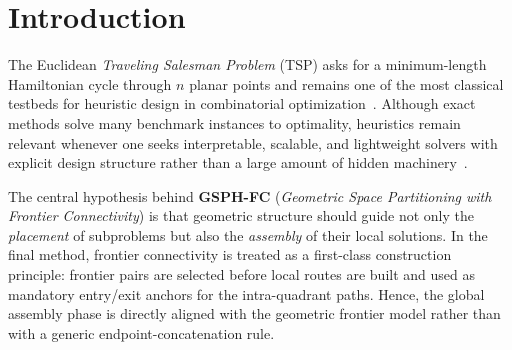 \documentclass[runningheads]{llncs}
\begin{document}
\begin{abstract}
We propose \textbf{GSPH-FC} (\textit{Geometric Space Partitioning with
Frontier Connectivity}), a geometric heuristic for the Euclidean
Traveling Salesman Problem (TSP). The method partitions the plane into
four quadrants, detects candidate cross-quadrant frontier pairs, and
constructs anchored intra-quadrant paths whose endpoints are fixed by
those frontier decisions. The resulting tour is assembled in geometric
order and refined by a strong time-driven polishing stage combining
candidate-set 2-opt, Or-opt with reversed insertion, and iterated local
search with double-bridge perturbations and localized reoptimization.
This yields an implementation that is mathematically consistent with the
frontier model and substantially stronger than a plain
endpoint-concatenation scheme. On the verified TSPLIB subset under
\texttt{EUC\_2D}, the final solver reaches the Best Known Solution (BKS)
exactly on many small and medium instances, including \texttt{pr124},
\texttt{pr144}, \texttt{pr152}, \texttt{ts225}, and \texttt{kroA200},
while remaining within 0.5\% of the BKS on harder cases such as
\texttt{a280}, \texttt{gil262}, and \texttt{lin318}. The method remains
geometrically interpretable and computationally competitive, while
delivering strong solution quality across the benchmark subset studied
here.
\end{abstract}

\section{Introduction}

The Euclidean \textit{Traveling Salesman Problem} (TSP) asks for a
minimum-length Hamiltonian cycle through $n$ planar points and remains
one of the most classical testbeds for heuristic design in
combinatorial optimization~\cite{applegate2006tsp,laporte1992tsp}.
Although exact methods solve many benchmark instances to optimality,
heuristics remain relevant whenever one seeks interpretable, scalable,
and lightweight solvers with explicit design structure rather than a
large amount of hidden machinery~\cite{garey1979computers,mardones2023}.

The central hypothesis behind \textbf{GSPH-FC} (\textit{Geometric Space
Partitioning with Frontier Connectivity}) is that geometric structure
should guide not only the \emph{placement} of subproblems but also the
\emph{assembly} of their local solutions. In the final method,
frontier connectivity is treated as a first-class construction
principle: frontier pairs are selected before local routes are built and
used as mandatory entry/exit anchors for the intra-quadrant paths.
Hence, the global assembly phase is directly aligned with the geometric
frontier model rather than with a generic endpoint-concatenation rule.
\end{document}
